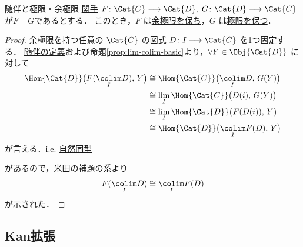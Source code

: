\documentclass[TQFT_main]{subfiles}
\begin{document}
\begin{myprop}[label=prop:adj-lim]{随伴と極限・余極限}
    \hyperref[def:functor]{関手} $F \colon \Cat{C} \lto \Cat{D},\; G \colon \Cat{D} \lto \Cat{C}$ が\hyperref[def:adjoint]{$F \dashv G$}であるとする．
    このとき，$F$ は\hyperref[def:preserve-colim]{余極限を保ち}，$G$ は\hyperref[def:preserve-lim]{極限を保つ}．
\end{myprop}

\begin{proof}
    \hyperref[def:colim]{余極限}を持つ任意の $\Cat{C}$ の図式 $D \colon I \lto \Cat{C}$ を1つ固定する．
    \hyperref[def:adjoint]{随伴の定義}および命題\ref{prop:lim-colim-basic}より，$\forall Y \in \Obj{\Cat{D}}$ に対して
    \begin{align}
        \Hom{\Cat{D}} \bigl( F(\underset{I}{\colim} D),\, Y \bigr) 
        &\cong \Hom{\Cat{C}} \bigl( \underset{I}{\colim} D,\, G(Y) \bigr) \\
        &\cong \lim_I \Hom{\Cat{C}} \bigl( D(i),\, G(Y) \bigr) \\
        &\cong \lim_I \Hom{\Cat{D}} \bigl( F(D(i)),\, Y \bigr) \\
        &\cong \Hom{\Cat{D}} \bigl( \underset{I}{\colim} F(D),\, Y \bigr) 
    \end{align}
    が言える．i.e. \hyperref[def:iso]{自然同型}
    \begin{center}
    \end{center}
    があるので，\hyperref[col:Yoneda]{米田の補題の系}より
    \begin{align}
        F(\underset{I}{\colim} D) \cong \underset{I}{\colim} F(D)
    \end{align}
    が示された．
\end{proof}

\subsection{Kan拡張}
\end{document}

